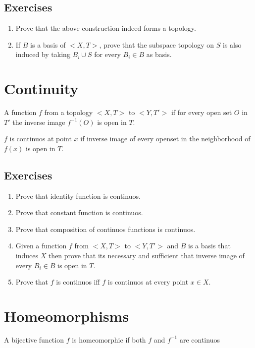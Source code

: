 \documentclass[twosides, openany]{tufte-book}
\begin{document}
\section{Exercises}
\begin{enumerate}
    \item Prove that the above construction indeed forms a topology.
    \item If $B$ is a basis of $<X,T>$, prove that the subspace topology on $S$ is also induced by taking $B_i \cup S$ for every $B_i \in B$ as basis.
\end{enumerate}

\chapter{Continuity}
A function $f$ from a topology $<X, T>$ to $<Y, T'>$ if for every open set $O$ in $T'$ the inverse image $f^{-1}(O)$ is open in $T$. 

$f$ is continuos at point $x$ if inverse image of every openset in the neighborhood of $f(x)$ is open in $T$.
\section{Exercises}
    \begin{enumerate}
        \item Prove that identity function is continuos.
        \item Prove that constant function is continuos. 
        \item Prove that composition of continuos functions is continuos.
        \item Given a function $f$ from $<X, T>$ to $<Y, T'>$ and $B$ is a basis that induces $X$ then prove that its necessary and sufficient that inverse image of every $B_i \in B$ is open in $T$.
        \item Prove that $f$ is continuos iff $f$ is continuos at every point $x \in X$.
    \end{enumerate}

\chapter{Homeomorphisms}
A bijective function $f$ is homeomorphic if both $f$ and $f^{-1}$ are continuos 
\end{document}

